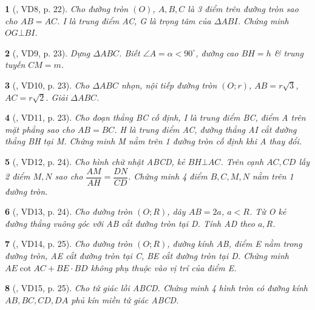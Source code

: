 \documentclass{article}
\newtheorem{baitoan}{}
\begin{document}
\begin{baitoan}[\cite{TLCT_THCS_Toan_9_hinh_hoc}, VD8, p. 22]
	Cho đường tròn $(O)$, $A,B,C$ là 3 điểm trên đường tròn sao cho $AB = AC$. I là trung điểm AC, G là trọng tâm của $\Delta ABI$. Chứng minh $OG\bot BI$.
\end{baitoan}

\begin{baitoan}[\cite{TLCT_THCS_Toan_9_hinh_hoc}, VD9, p. 23]
	Dựng $\Delta ABC$. Biết $\angle{A} = \alpha < 90^\circ$, đường cao $BH = h$ \& trung tuyến $CM = m$.
\end{baitoan}

\begin{baitoan}[\cite{TLCT_THCS_Toan_9_hinh_hoc}, VD10, p. 23]
	Cho $\Delta ABC$ nhọn, nội tiếp đường tròn $(O;r)$, $AB = r\sqrt{3}$, $AC = r\sqrt{2}$. Giải $\Delta ABC$.
\end{baitoan}

\begin{baitoan}[\cite{TLCT_THCS_Toan_9_hinh_hoc}, VD11, p. 23]
	Cho đoạn thẳng BC cố định, I là trung điểm BC, điểm A trên mặt phẳng sao cho $AB = BC$. H là trung điểm AC, đường thẳng AI cắt đường thẳng BH tại M. Chứng minh M nằm trên 1 đường tròn cố định khi A thay đổi.
\end{baitoan}

\begin{baitoan}[\cite{TLCT_THCS_Toan_9_hinh_hoc}, VD12, p. 24]
	Cho hình chữ nhật ABCD, kẻ $BH\bot AC$. Trên cạnh $AC,CD$ lấy 2 điểm $M,N$ sao cho $\dfrac{AM}{AH} = \dfrac{DN}{CD}$. Chứng minh 4 điểm $B,C,M,N$ nằm trên 1 đường tròn.
\end{baitoan}

\begin{baitoan}[\cite{TLCT_THCS_Toan_9_hinh_hoc}, VD13, p. 24]
	Cho đường tròn $(O;R)$, dây $AB = 2a$, $a < R$. Từ O kẻ đường thẳng vuông góc với AB cắt đường tròn tại D. Tính AD theo $a,R$.
\end{baitoan}

\begin{baitoan}[\cite{TLCT_THCS_Toan_9_hinh_hoc}, VD14, p. 25]
	Cho đường tròn $(O;R)$, đường kính AB, điểm E nằm trong đường tròn, AE cắt đường tròn tại C, BE cắt đường tròn tại D. Chứng minh $AE\cot AC + BE\cdot BD$ không phụ thuộc vào vị trí của điểm E.
\end{baitoan}

\begin{baitoan}[\cite{TLCT_THCS_Toan_9_hinh_hoc}, VD15, p. 25]
	Cho tứ giác lồi ABCD. Chứng minh 4 hình tròn có đường kính $AB,BC,CD,DA$ phủ kín miền tứ giác ABCD.
\end{baitoan}
\end{document}
